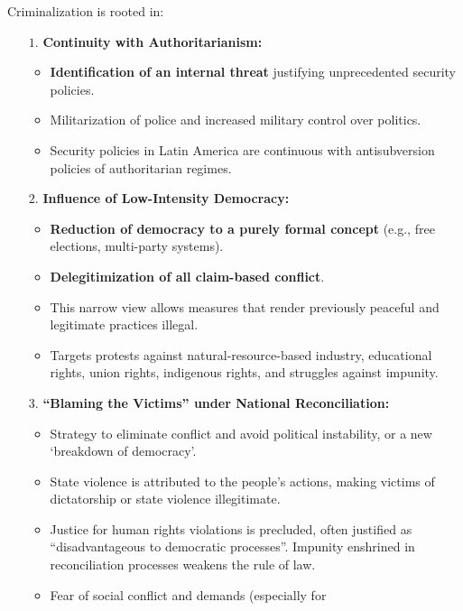 \documentclass{article}
\begin{document}
    \noindent Criminalization is rooted in:
    \begin{itemize}
        \item [$1$.] \textbf{Continuity with Authoritarianism:}
        \begin{itemize}
            \item \textbf{Identification of an internal threat} justifying
            unprecedented security policies.
            \item Militarization of police and increased military control
            over politics.
            \item Security policies in Latin America are continuous with
            antisubversion policies of authoritarian regimes.
        \end{itemize}
        \item[$2$.] \textbf{Influence of Low-Intensity Democracy:}
        \begin{itemize}
            \item \textbf{Reduction of democracy to a purely formal concept} (e.g., free elections, multi-party systems).
            \item \textbf{Delegitimization of all claim-based conflict}.
            \item This narrow view allows measures that render previously
            peaceful and legitimate practices illegal.
            \item Targets protests against natural-resource-based industry,
            educational rights, union rights, indigenous rights, and
            struggles against impunity.
        \end{itemize}
        \item[$3$.]
        \textbf{``Blaming the Victims'' under National Reconciliation:}
        \begin{itemize}
            \item Strategy to eliminate conflict and avoid political
            instability, or a new `breakdown of democracy'.
            \item State violence is attributed to the people's actions,
            making victims of dictatorship or state violence illegitimate.
            \item Justice for human rights violations is precluded, often
            justified as ``disadvantageous to democratic processes''.
            Impunity enshrined in reconciliation processes weakens the rule
            of law.
            \item Fear of social conflict and demands (especially for

\end{itemize}
\end{itemize}
\end{document}

